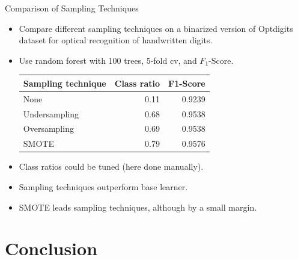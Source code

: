 \documentclass[11pt,compress,t,notes=noshow, xcolor=table]{beamer}
\begin{document}
\begin{frame}{Comparison of Sampling Techniques}

    \begin{itemize}
    
        \item Compare different sampling techniques on a binarized version of Optdigits dataset for optical recognition of handwritten digits.
    
        \item Use random forest with 100 trees, 5-fold cv, and $F_1$-Score. %
           \begin{center}
             \begin{tabular}{lrr}
             \toprule
             Sampling technique & Class ratio &F1-Score\\
             \midrule
             None & 0.11 &0.9239\\
             Undersampling & 0.68 & 0.9538\\
             Oversampling & 0.69& 0.9538\\
             SMOTE & 0.79 & 0.9576\\
             \bottomrule
             \end{tabular}    
            \end{center}
            
        \item Class ratios could be tuned (here done manually).
        \item Sampling techniques outperform base learner. 
        \item SMOTE leads sampling techniques, although by a small margin.

    \end{itemize}		

\end{frame}

\section{Conclusion}
\end{document}
